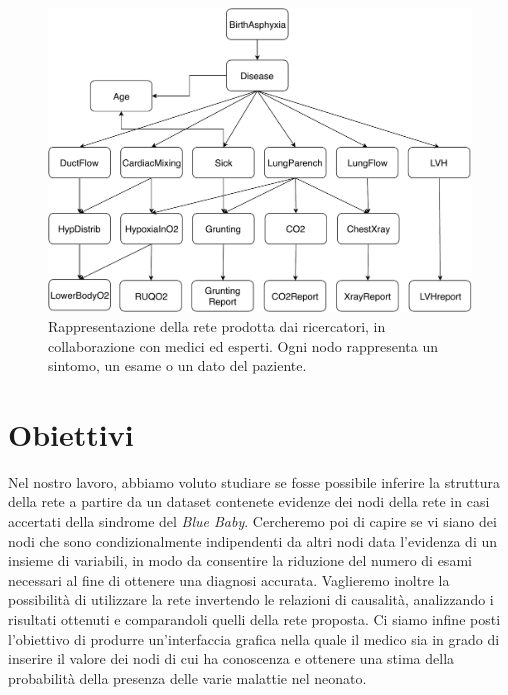  \begin{figure}
 	\centering
 	\includegraphics[width=1\linewidth]{images/paper_structure}
 	\caption{Rappresentazione della rete prodotta dai ricercatori, in collaborazione con medici ed esperti. Ogni nodo rappresenta un sintomo, un esame o un dato del paziente.}
 	\label{fig:paperstructure}
 \end{figure}

\section{Obiettivi}
Nel nostro lavoro, abbiamo voluto studiare se fosse possibile inferire la struttura della rete a partire da un dataset contenete evidenze dei nodi della rete in casi accertati della sindrome del \textit{Blue Baby}. Cercheremo poi di capire se vi siano dei nodi che sono condizionalmente indipendenti da altri nodi data l'evidenza di un insieme di variabili, in modo da consentire la riduzione del numero di esami necessari al fine di ottenere una diagnosi accurata. Vaglieremo inoltre la possibilità di utilizzare la rete invertendo le relazioni di causalità, analizzando i risultati ottenuti e comparandoli quelli della rete proposta. Ci siamo infine posti l'obiettivo di produrre un'interfaccia grafica nella quale il medico sia in grado di inserire il valore dei nodi di cui ha conoscenza e ottenere una stima della probabilità della presenza delle varie malattie nel neonato.